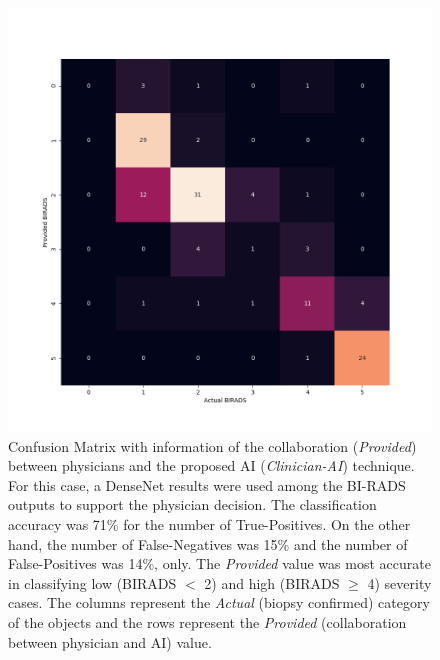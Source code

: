 \begin{figure}[htbp]
\centering
\includegraphics[width=\textwidth]{images/fig043}
\caption{Confusion Matrix with information of the collaboration ({\it Provided}) between physicians and the proposed AI ({\it Clinician-AI}) technique. For this case, a DenseNet results were used among the BI-RADS outputs to support the physician decision. The classification accuracy was 71\% for the number of True-Positives. On the other hand, the number of False-Negatives was 15\% and the number of False-Positives was 14\%, only. The {\it Provided} value was most accurate in classifying low (BIRADS $<$ 2) and high (BIRADS $\ge$ 4) severity cases. The columns represent the {\it Actual} (biopsy confirmed) category of the objects and the rows represent the {\it Provided} (collaboration between physician and AI) value.}
\label{fig:fig043}
\end{figure}


